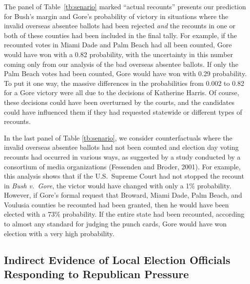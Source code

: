 \documentclass[11pt,titlepage]{article}
\begin{document}
The panel of Table~\ref{tb:senario} marked ``actual recounts''
presents our prediction for Bush's margin and Gore's probability of
victory in situations where the invalid overseas absentee ballots had
been rejected \emph{and} the recounts in one or both of these counties
had been included in the final tally.  For example, if the recounted
votes in Miami Dade and Palm Beach had all been counted, Gore would
have won with a 0.82 probability, with the uncertainty in this number
coming only from our analysis of the bad overseas absentee ballots.
If only the Palm Beach votes had been counted, Gore would have won
with 0.29 probability.  To put it one way, the massive differences in
the probabilities from 0.002 to 0.82 for a Gore victory were all due
to the decisions of Katherine Harris.  Of course, these decisions
could have been overturned by the courts, and the candidates could
have influenced them if they had requested statewide or different
types of recounts.

In the last panel of Table \ref{tb:senario}, we consider
counterfactuals where the invalid overseas absentee ballots had not
been counted and election day voting recounts had occurred in various
ways, as suggested by a study conducted by a consortium of media
organizations (Fessenden and Broder, 2001).  For example, this
analysis shows that if the U.S.\ Supreme Court had not stopped the
recount in \emph{Bush v.\ Gore}, the victor would have changed with
only a 1\% probability.  However, if Gore's formal request that
Broward, Miami Dade, Palm Beach, and Voulusia counties be recounted
had been granted, then he would have been elected with a 73\%
probability.  If the entire state had been recounted, according to
almost any standard for judging the punch cards, Gore would have won
election with a very high probability.

\subsection{Indirect Evidence of Local Election Officials Responding
  to Republican Pressure}
\end{document}
